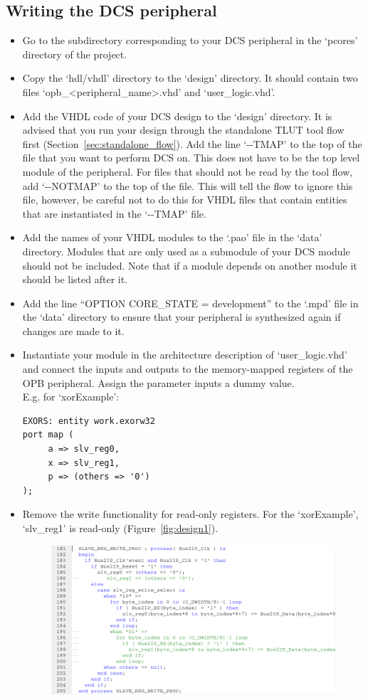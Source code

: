 \documentclass[a4paper,oneside]{memoir}
\begin{document}
\subsection{Writing the DCS peripheral}\label{sec:writing_peripheral}
\begin{itemize}
\item Go to the subdirectory corresponding to your DCS peripheral in the `pcores' directory of the project.
\item Copy the `hdl/vhdl' directory to the `design' directory. It should contain two files `opb\_<peripheral\_name>.vhd' and `user\_logic.vhd'.
\item Add the VHDL code of your DCS design to the `design' directory. It is advised that you run your design through the standalone TLUT tool flow first (Section\ \ref{sec:standalone_flow}). Add the line `-\--TMAP' to the top of the file that you want to perform DCS on. This does not have to be the top level module of the peripheral. For files that should not be read by the tool flow, add `-\--NOTMAP' to the top of the file. This will tell the flow to ignore this file, however, be careful not to do this for VHDL files that contain entities that are instantiated in the `-\--TMAP' file. 
\item Add the names of your VHDL modules to the `.pao' file in the `data' directory. Modules that are only used as a submodule of your DCS module should not be included. Note that if a module depends on another module it should be listed after it.
\item Add the line ``OPTION CORE\_STATE = development'' to the `.mpd' file in the `data' directory to ensure that your peripheral is synthesized again if changes are made to it.
\item Instantiate your module in the architecture description of `user\_logic.vhd' and connect the inputs and outputs to the memory-mapped registers of the OPB peripheral. Assign the parameter inputs a dummy value.\\
E.g. for  `xorExample':
\lstset{language=VHDL}
\begin{lstlisting}
EXORS: entity work.exorw32
port map (
     a => slv_reg0,
     x => slv_reg1,
     p => (others => '0')
);
\end{lstlisting}
\item Remove the write functionality for read-only registers. For the `xorExample',  `slv\_reg1' is read-only (Figure~\ref{fig:design1}).
\begin{figure}[H]
\centering
\includegraphics[scale=0.5]{design1}

\end{figure}
\end{itemize}
\end{document}
